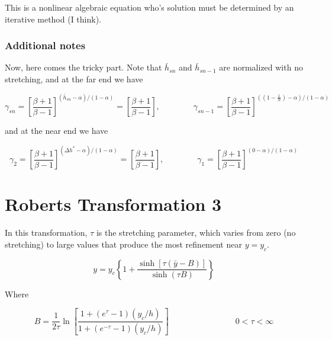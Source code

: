 \documentclass[11pt]{article}
\begin{document}
This is a nonlinear algebraic equation who's solution must be determined by an iterative method (I think).

\subsubsection{Additional notes}
Now, here comes the tricky part.
Note that $\bar{h}_{sn}$ and $\bar{h}_{sn-1}$ are normalized with no stretching, and at the far end we have

\begin{equation}
	\gamma_{sn} = \left[ 
	\frac{\beta+1}{\beta-1}
	\right]^{(\bar{h}_{sn}-\alpha)/(1-\alpha)} = 
	\left[ 
	\frac{\beta+1}{\beta-1}
	\right]
	, \qquad \qquad
	\gamma_{sn-1} = \left[ 
	\frac{\beta+1}{\beta-1}
	\right]^{((1 - \frac{1}{N})-\alpha)/(1-\alpha)}
\end{equation}

and at the near end we have

\begin{equation}
	\gamma_{2} = \left[ 
	\frac{\beta+1}{\beta-1}
	\right]^{(\Delta h^*-\alpha)/(1-\alpha)} = 
	\left[ 
	\frac{\beta+1}{\beta-1}
	\right]
	, \qquad \qquad
	\gamma_{1} = \left[ 
	\frac{\beta+1}{\beta-1}
	\right]^{(0-\alpha)/(1-\alpha)}
\end{equation}



\section{Roberts Transformation 3}
In this transformation, $\tau$ is the stretching parameter, which varies from zero (no stretching) to large values that produce the most refinement near $y=y_c$.

\begin{equation}
	y
	=
	y_c
	\left\{
	1
	+
	\frac{\sinh[\tau (\bar{y}-B)]}
	{\sinh(\tau B)}
	\right\}
\end{equation}

Where

\begin{equation}
	B
	=
	\frac{1}{2\tau}
	\ln 
	\left[
	\frac{1+(e^\tau-1) (y_c/h)}{1+(e^{-\tau}-1) (y_c/h)}
	\right]
	\qquad \qquad \qquad \qquad
	0 <\tau < \infty
\end{equation}




\end{document}
